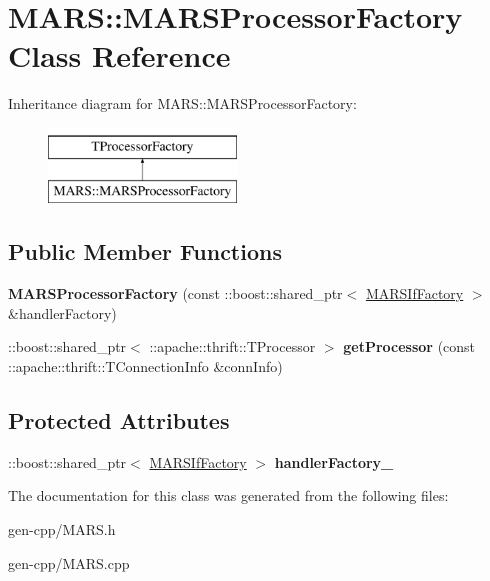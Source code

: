 \hypertarget{classMARS_1_1MARSProcessorFactory}{}\section{M\+A\+RS\+:\+:M\+A\+R\+S\+Processor\+Factory Class Reference}
\label{classMARS_1_1MARSProcessorFactory}
Inheritance diagram for M\+A\+RS\+:\+:M\+A\+R\+S\+Processor\+Factory\+:\begin{figure}[H]
\begin{center}
\leavevmode
\includegraphics[height=2.000000cm]{classMARS_1_1MARSProcessorFactory}
\end{center}
\end{figure}
\subsection*{Public Member Functions}
\begin{DoxyCompactItemize}
\item 
\mbox{\label{classMARS_1_1MARSProcessorFactory_a5995e5f3bde4390ed8dac9cf178aef36}} 
{\bfseries M\+A\+R\+S\+Processor\+Factory} (const \+::boost\+::shared\+\_\+ptr$<$ \hyperlink{classMARS_1_1MARSIfFactory}{M\+A\+R\+S\+If\+Factory} $>$ \&handler\+Factory)
\item 
\mbox{\label{classMARS_1_1MARSProcessorFactory_a09dcb130d6c3b77b66c5a9245307ad7f}} 
\+::boost\+::shared\+\_\+ptr$<$ \+::apache\+::thrift\+::\+T\+Processor $>$ {\bfseries get\+Processor} (const \+::apache\+::thrift\+::\+T\+Connection\+Info \&conn\+Info)
\end{DoxyCompactItemize}
\subsection*{Protected Attributes}
\begin{DoxyCompactItemize}
\item 
\mbox{\label{classMARS_1_1MARSProcessorFactory_a352698490206c21fd31606a0f7ff8fb9}} 
\+::boost\+::shared\+\_\+ptr$<$ \hyperlink{classMARS_1_1MARSIfFactory}{M\+A\+R\+S\+If\+Factory} $>$ {\bfseries handler\+Factory\+\_\+}
\end{DoxyCompactItemize}


The documentation for this class was generated from the following files\+:\begin{DoxyCompactItemize}
\item 
gen-\/cpp/M\+A\+R\+S.\+h\item 
gen-\/cpp/M\+A\+R\+S.\+cpp\end{DoxyCompactItemize}
